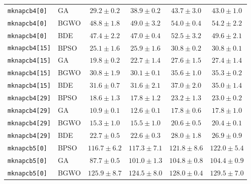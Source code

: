 \documentclass[journal,article,submit,moreauthors]{Definitions/mdpi}
\begin{document}
\begin{longtable}{llcccc}
    \texttt{mknapcb4[0]} & GA    &  $\mathbf{29.2 \pm 0.2}$ &           $38.9 \pm 0.2$ &           $43.7 \pm 3.0$ &           $43.0 \pm 1.0$ \\
    \texttt{mknapcb4[0]} & BGWO  &  $\mathbf{48.8 \pm 1.8}$ &           $49.0 \pm 3.2$ &           $54.0 \pm 0.4$ &           $54.2 \pm 2.2$ \\
    \texttt{mknapcb4[0]} & BDE   &           $47.4 \pm 2.2$ &  $\mathbf{47.0 \pm 0.4}$ &           $52.5 \pm 3.2$ &           $49.6 \pm 2.1$ \\
    \midrule
    \texttt{mknapcb4[15]} & BPSO  &  $\mathbf{25.1 \pm 1.6}$ &           $25.9 \pm 1.6$ &           $30.8 \pm 0.2$ &           $30.8 \pm 0.1$ \\
    \texttt{mknapcb4[15]} & GA    &  $\mathbf{19.8 \pm 0.2}$ &           $22.7 \pm 1.4$ &           $27.6 \pm 1.5$ &           $27.4 \pm 1.4$ \\
    \texttt{mknapcb4[15]} & BGWO  &           $30.8 \pm 1.9$ &  $\mathbf{30.1 \pm 0.1}$ &           $35.6 \pm 1.0$ &           $35.3 \pm 0.2$ \\
    \texttt{mknapcb4[15]} & BDE   &  $\mathbf{31.6 \pm 0.7}$ &           $31.6 \pm 2.1$ &           $37.0 \pm 2.0$ &           $35.0 \pm 1.4$ \\
    \midrule
    \texttt{mknapcb4[29]} & BPSO  &           $18.6 \pm 1.3$ &  $\mathbf{17.8 \pm 1.2}$ &           $23.2 \pm 1.3$ &           $23.0 \pm 0.2$ \\
    \texttt{mknapcb4[29]} & GA    &  $\mathbf{10.9 \pm 0.1}$ &           $12.6 \pm 0.1$ &           $17.8 \pm 0.6$ &           $17.8 \pm 1.0$ \\
    \texttt{mknapcb4[29]} & BGWO  &  $\mathbf{15.3 \pm 1.0}$ &           $15.5 \pm 1.0$ &           $20.6 \pm 0.5$ &           $20.4 \pm 0.1$ \\
    \texttt{mknapcb4[29]} & BDE   &           $22.7 \pm 0.5$ &  $\mathbf{22.6 \pm 0.3}$ &           $28.0 \pm 1.8$ &           $26.9 \pm 0.9$ \\
    \midrule
    \texttt{mknapcb5[0]} & BPSO  & $\mathbf{116.7 \pm 6.2}$ &          $117.3 \pm 7.1$ &          $121.8 \pm 8.6$ &          $122.0 \pm 5.4$ \\
    \texttt{mknapcb5[0]} & GA    &  $\mathbf{87.7 \pm 0.5}$ &          $101.0 \pm 1.3$ &          $104.8 \pm 0.8$ &          $104.4 \pm 0.9$ \\
    \texttt{mknapcb5[0]} & BGWO  &          $125.9 \pm 8.7$ & $\mathbf{124.5 \pm 8.0}$ &          $128.0 \pm 0.4$ &          $129.5 \pm 7.0$ \\

\end{longtable}
\end{document}

